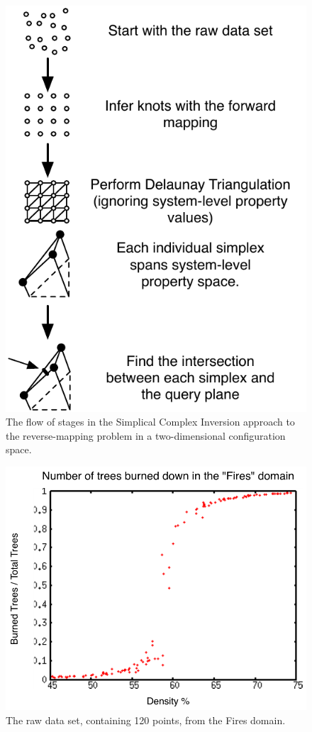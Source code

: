 \begin{figure}[ht]
\centering
\includegraphics[scale=1]{images/ISflow.pdf}
\caption{The flow of stages in the Simplical Complex Inversion approach to the reverse-mapping problem in a two-dimensional configuration space.}
\label{fig:ISFlow}
\end{figure}


\begin{figure}[ht]
\centering
\includegraphics[scale=.66666667]{images/rii0.pdf}
\caption{The raw data set, containing 120 points, from the Fires domain.}
\label{fig:rii0}
\end{figure}

